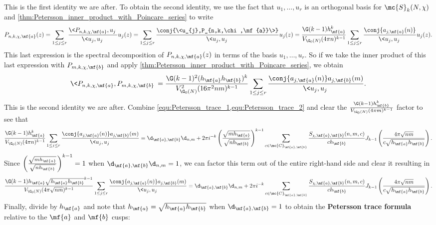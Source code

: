 \documentclass[12pt]{article}
\begin{document}
      This is the first identity we are after. To obtain the second identity, we use the fact that \(u_{1},\ldots,u_{r}\) is an orthogonal basis for \(\mc{S}_{k}(N,\chi)\) and \cref{thm:Petersson_inner_product_with_Poincare_series} to write
      \[
        P_{n,k,\chi,\mf{a}}(z) = \sum_{1 \le j \le r}\frac{\<P_{n,k,\chi,\mf{a}},u_{j}\>}{\<u_{j},u_{j}\>}u_{j}(z) = \sum_{1 \le j \le r}\frac{\conj{\<u_{j},P_{n,k,\chi,\mf{a}}\>}}{\<u_{j},u_{j}\>}u_{j}(z) = \frac{\G(k-1)h_{\mf{a}}^{k}}{V_{\G_{0}(N)}(4\pi n)^{k-1}}\sum_{1 \le j \le r}\frac{\conj{a_{j,\mf{a}}(n)}}{\<u_{j},u_{j}\>}u_{j}(z).
      \]
      This last expression is the spectral decomposition of \(P_{n,k,\chi,\mf{a}}(z)\) in terms of the basis \(u_{1},\ldots,u_{r}\). So if we take the inner product of this last expression with \(P_{m,k,\chi,\mf{b}}\) and apply \cref{thm:Petersson_inner_product_with_Poincare_series}, we obtain
      \begin{equation}\label{equ:Petersson_trace_2}
        \<P_{n,k,\chi,\mf{a}},P_{m,k,\chi,\mf{b}}\> = \frac{\G(k-1)^{2}(h_{\mf{a}}h_{\mf{b}})^{k}}{V_{\G_{0}(N)}^{2}(16\pi^{2}nm)^{k-1}}\sum_{1 \le j \le r}\frac{\conj{a_{j,\mf{a}}(n)}a_{j,\mf{b}}(m)}{\<u_{j},u_{j}\>}.
      \end{equation}
      This is the second identity we are after. Combine \cref{equ:Petersson_trace_1,equ:Petersson_trace_2} and clear the \(\frac{\G(k-1)h_{\mf{b}}^{k}}{V_{\G_{0}(N)}(4\pi m)^{k-1}}\) factor to see that
      \[
        \frac{\G(k-1)h_{\mf{a}}^{k}}{V_{\G_{0}(N)}(4\pi n)^{k-1}}\sum_{1 \le j \le r}\frac{\conj{a_{j,\mf{a}}(n)}a_{j,\mf{b}}(m)}{\<u_{j},u_{j}\>} = \d_{\mf{a},\mf{b}}\d_{n,m}+2\pi i^{-k}\left(\frac{\sqrt{mh_{\mf{a}}}}{\sqrt{nh_{\mf{b}}}}\right)^{k-1}\sum_{c \in \mc{C}_{\mf{a},\mf{b}}}\frac{S_{\chi,\mf{a},\mf{b}}(n,m,c)}{ch_{\mf{b}}}J_{k-1}\left(\frac{4\pi\sqrt{nm}}{c\sqrt{h_{\mf{a}}h_{\mf{b}}}}\right).
      \]
      Since \(\left(\frac{\sqrt{mh_{\mf{a}}}}{\sqrt{nh_{\mf{b}}}}\right)^{k-1} = 1\) when \(\d_{\mf{a},\mf{b}}\d_{n,m} = 1\), we can factor this term out of the entire right-hand side and clear it resulting in
      \[
        \frac{\G(k-1)h_{\mf{a}}\sqrt{h_{\mf{a}}h_{\mf{b}}}^{k-1}}{V_{\G_{0}(N)}(4\pi\sqrt{nm})^{k-1}}\sum_{1 \le j \le r}\frac{\conj{a_{j,\mf{a}}(n)}a_{j,\mf{b}}(m)}{\<u_{j},u_{j}\>} = \d_{\mf{a},\mf{b}}\d_{n,m}+2\pi i^{-k}\sum_{c \in \mc{C}_{\mf{a},\mf{b}}}\frac{S_{\chi,\mf{a},\mf{b}}(n,m,c)}{ch_{\mf{b}}}J_{k-1}\left(\frac{4\pi\sqrt{nm}}{c\sqrt{h_{\mf{a}}h_{\mf{b}}}}\right).
      \]
      Finally, divide by \(h_{\mf{a}}\) and note that \(h_{\mf{a}} = \sqrt{h_{\mf{a}}h_{\mf{b}}}\) when \(\d_{\mf{a},\mf{b}} = 1\) to obtain the \textbf{Petersson trace formula} relative to the \(\mf{a}\) and \(\mf{b}\) cusps:
\end{document}
